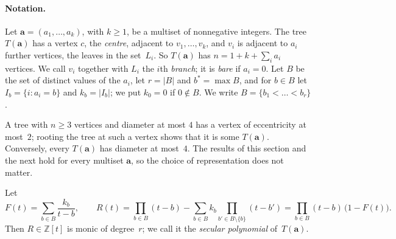 \documentclass[11pt]{article}
\numberwithin{equation}{section}
\theoremstyle{remark}
\newcommand{\Z}{\mathbb Z}
\newcommand{\bfa}{\mathbf a}
\begin{document}
\paragraph{Notation.}
Let $\bfa=(a_1,\dots,a_k)$, with $k\ge1$, be a multiset of nonnegative
integers. The tree $T(\bfa)$ has a vertex $c$, the \emph{centre}, adjacent to
$v_1,\dots,v_k$, and $v_i$ is adjacent to $a_i$ further vertices, the leaves in
the set~$L_i$. So $T(\bfa)$ has $n=1+k+\sum_ia_i$ vertices. We call $v_i$
together with $L_i$ the $i$th \emph{branch}; it is \emph{bare} if $a_i=0$. Let
$B$ be the set of distinct values of the $a_i$, let $r=|B|$ and
$b^*=\max B$, and for $b\in B$ let $I_b=\{i:a_i=b\}$ and $k_b=|I_b|$; we put
$k_0=0$ if $0\notin B$. We write $B=\{b_1<\dots<b_r\}$.

A tree with $n\ge3$ vertices and diameter at most $4$ has a vertex of
eccentricity at most~$2$; rooting the tree at such a vertex shows that it is
some $T(\bfa)$. Conversely, every $T(\bfa)$ has diameter at most~$4$. The
results of this section and the next hold for every multiset $\bfa$, so the
choice of representation does not matter.

Let
\[
 F(t)=\sum_{b\in B}\frac{k_b}{t-b},\qquad
 R(t)=\prod_{b\in B}(t-b)-\sum_{b\in B}k_b\prod_{b'\in B\setminus\{b\}}(t-b')
 =\prod_{b\in B}(t-b)\,\bigl(1-F(t)\bigr).
\]
Then $R\in\Z[t]$ is monic of degree~$r$; we call it the \emph{secular
polynomial} of~$T(\bfa)$.
\end{document}
